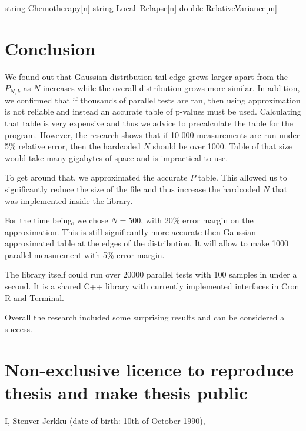 \documentclass[12pt]{article}
\begin{document}
string Chemotherapy[n]
string Local\ Relapse[n]
double RelativeVariance[m]
\newpage

\section{Conclusion}
We found out that Gaussian distribution tail edge grows larger apart from the $P_{N, k}$ as $N$ increases while the overall distribution grows more similar. In addition, we confirmed that if thousands of parallel tests are ran, then using approximation is not reliable and instead an accurate table of p-values must be used. Calculating that table is very expensive and thus we advice to precalculate the table for the program. However, the research shows that if 10 000 measurements are run under 5\% relative error, then the hardcoded $N$ should be over 1000. Table of that size would take many gigabytes of space and is impractical to use.

To get around that, we approximated the accurate $P$ table. This allowed us to significantly reduce the size of the file and thus increase the hardcoded $N$ that was implemented inside the library.

For the time being, we chose $N=500$, with $20\%$ error margin on the approximation. This is still significantly more accurate then Gaussian approximated table at the edges of the distribution. It will allow to make 1000 parallel measurement with 5\% error margin.

The library itself could run over 20000 parallel tests with 100 samples in under a second. It is a shared C++ library with currently implemented interfaces in Cron R and Terminal.

Overall the research included some surprising results and can be considered a success.

\newpage




\appendix
\pagebreak

\section*{\small Non-exclusive licence to reproduce thesis and make thesis public}

I, Stenver Jerkku (date of birth: 10th of October 1990),
\end{document}
